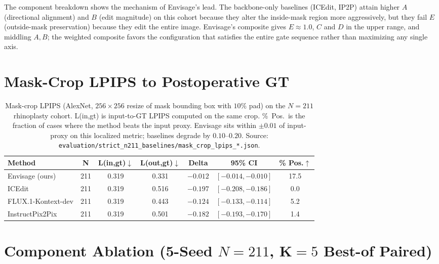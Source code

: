 \documentclass{article}
\newcommand{\method}{Envisage}
\begin{document}
The component breakdown shows the mechanism of \method{}'s lead. The
backbone-only baselines (ICEdit, IP2P) attain higher $A$ (directional
alignment) and $B$ (edit magnitude) on this cohort because they alter the
inside-mask region more aggressively, but they fail $E$ (outside-mask
preservation) because they edit the entire image. \method{}'s composite gives
$E{\approx}1.0$, $C$ and $D$ in the upper range, and middling $A,B$; the
weighted composite favors the configuration that satisfies the entire gate
sequence rather than maximizing any single axis.

\section{Mask-Crop LPIPS to Postoperative GT}
\label{app:mask_crop}

\begin{table}[h]
\centering
\small
\caption{Mask-crop LPIPS (AlexNet, $256{\times}256$ resize of mask bounding
box with $10\%$ pad) on the $N{=}211$ rhinoplasty cohort. L(in,gt) is
input-to-GT LPIPS computed on the same crop. \%~Pos.\ is the fraction of
cases where the method beats the input proxy. \method{} sits within $\pm 0.01$
of input-proxy on this localized metric; baselines degrade by $0.10$--$0.20$.
Source: \texttt{evaluation/strict\_n211\_baselines/mask\_crop\_lpips\_*.json}.}
\label{tab:mask_crop}
\begin{tabular}{@{}lcccccc@{}}
\toprule
\textbf{Method} & \textbf{N} & \textbf{L(in,gt)}$\downarrow$ &
\textbf{L(out,gt)}$\downarrow$ & \textbf{Delta} & \textbf{95\% CI} &
\textbf{\% Pos.}$\uparrow$ \\
\midrule
\method{} (ours)    & 211 & 0.319 & 0.331 & $-0.012$ & $[-0.014, -0.010]$ & 17.5 \\
ICEdit              & 211 & 0.319 & 0.516 & $-0.197$ & $[-0.208, -0.186]$ & 0.0 \\
FLUX.1-Kontext-dev  & 211 & 0.319 & 0.443 & $-0.124$ & $[-0.133, -0.114]$ & 5.2 \\
InstructPix2Pix     & 211 & 0.319 & 0.501 & $-0.182$ & $[-0.193, -0.170]$ & 1.4 \\
\bottomrule
\end{tabular}
\end{table}

\section{Component Ablation (5-Seed $N{=}211$, K$=5$ Best-of Paired)}
\label{app:ablation}
\end{document}
